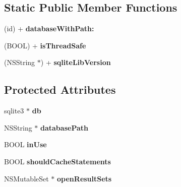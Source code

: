 \subsection*{Static Public Member Functions}
\begin{DoxyCompactItemize}
\item 
\hypertarget{interface_f_m_database_ab65b63dadcef6dfc1b9ad69b5e87121b}{
(id) + {\bfseries databaseWithPath:}}
\label{interface_f_m_database_ab65b63dadcef6dfc1b9ad69b5e87121b}

\item 
\hypertarget{interface_f_m_database_a532eb7417f941f35a0bc33417e1ecd24}{
(BOOL) + {\bfseries isThreadSafe}}
\label{interface_f_m_database_a532eb7417f941f35a0bc33417e1ecd24}

\item 
\hypertarget{interface_f_m_database_af5346854489f87c6842d6cc9e89e3c01}{
(NSString $\ast$) + {\bfseries sqliteLibVersion}}
\label{interface_f_m_database_af5346854489f87c6842d6cc9e89e3c01}

\end{DoxyCompactItemize}
\subsection*{Protected Attributes}
\begin{DoxyCompactItemize}
\item 
\hypertarget{interface_f_m_database_ad6e663497d2c934364b3bcf07496b30b}{
sqlite3 $\ast$ {\bfseries db}}
\label{interface_f_m_database_ad6e663497d2c934364b3bcf07496b30b}

\item 
\hypertarget{interface_f_m_database_a4bc10b66b56b688687e0b682605e3a8f}{
NSString $\ast$ {\bfseries databasePath}}
\label{interface_f_m_database_a4bc10b66b56b688687e0b682605e3a8f}

\item 
\hypertarget{interface_f_m_database_abd0d0cf0ca1a54786f383d279a02bdb6}{
BOOL {\bfseries inUse}}
\label{interface_f_m_database_abd0d0cf0ca1a54786f383d279a02bdb6}

\item 
\hypertarget{interface_f_m_database_a2876c2ced35db47c09e064cb9682ca5c}{
BOOL {\bfseries shouldCacheStatements}}
\label{interface_f_m_database_a2876c2ced35db47c09e064cb9682ca5c}

\item 
\hypertarget{interface_f_m_database_a397b5283bd12489fe26fb4e2f91d5292}{
NSMutableSet $\ast$ {\bfseries openResultSets}}
\label{interface_f_m_database_a397b5283bd12489fe26fb4e2f91d5292}

\end{DoxyCompactItemize}
